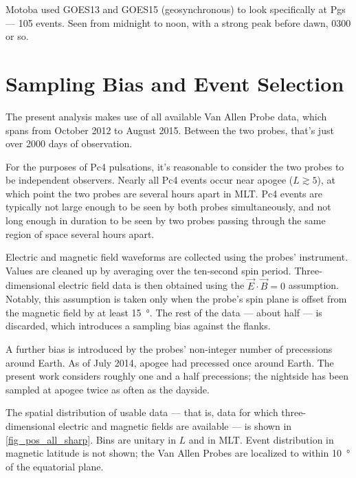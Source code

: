 Motoba\cite{motoba_2015} used GOES13 and GOES15 (geosynchronous) to look specifically at Pgs --- 105 events. Seen from midnight to noon, with a strong peak before dawn, 0300 or so. 

\section{Sampling Bias and Event Selection}
  \label{sec_selection}

The present analysis makes use of all available Van Allen Probe data, which spans from October 2012 to August 2015. Between the two probes, that's just over 2000 days of observation. 

For the purposes of Pc4 pulsations, it's reasonable to consider the two probes to be independent observers. Nearly all Pc4 events occur near apogee ($L\gtrsim5$), at which point the two probes are several hours apart in MLT. Pc4 events are typically not large enough to be seen by both probes simultaneously, and not long enough in duration to be seen by two probes passing through the same region of space several hours apart. 


Electric and magnetic field waveforms are collected using the probes' \todo{$\cdots$} instrument. Values are cleaned up by averaging over the ten-second spin period. Three-dimensional electric field data is then obtained using the $\vec{E} \cdot \vec{B} = 0$ assumption. Notably, this assumption is taken only when the probe's spin plane is offset from the magnetic field by at least \SI{15}{\degree}. The rest of the data --- about half --- is discarded, which introduces a sampling bias against the flanks. 

A further bias is introduced by the probes' non-integer number of precessions around Earth. As of July 2014, apogee had precessed once around Earth\cite{dai_2015}. The present work considers roughly one and a half precessions; the nightside has been sampled at apogee twice as often as the dayside. 

The spatial distribution of usable data --- that is, data for which three-dimensional electric and magnetic fields are available --- is shown in \cref{fig_pos_all_sharp}. Bins are unitary in $L$ and in MLT. Event distribution in magnetic latitude is not shown; the Van Allen Probes are localized to within \about\SI{10}{\degree} of the equatorial plane. 

